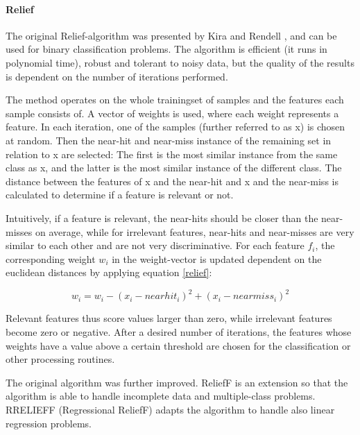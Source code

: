 \paragraph{Relief}
\label{par:methods.flat.filter.relief}

The original Relief-algorithm was presented by Kira and Rendell \cite{Kira:92}, and can be used for binary classification problems. The algorithm is efficient (it runs in polynomial time), robust and tolerant to noisy data, but the quality of the results is dependent on the number of iterations performed.

The method operates on the whole trainingset of samples and the features each sample consists of. A vector of weights is used, where each weight represents a feature. In each iteration, one of the samples (further referred to as x) is chosen at random. Then the near-hit and near-miss instance of the remaining set in relation to x are selected: The first is the most similar instance from the same class as x, and the latter is the most similar instance of the different class. The distance between the features of x and the near-hit and x and the near-miss is calculated to determine if a feature is relevant or not.  

Intuitively, if a feature is relevant, the near-hits should be closer than the near-misses on average, while for irrelevant features, near-hits and near-misses are very similar to each other and are not very discriminative. For each feature $f_i$, the corresponding weight $w_i$ in the weight-vector is updated dependent on the euclidean distances by applying equation \ref{relief}:

\begin{equation}
\label{relief}
	w_i = w_i - (x_i - nearhit_i)^2  + (x_i - nearmiss_i)^2
\end{equation}

Relevant features thus score values larger than zero, while irrelevant features become zero or negative. After a desired number of iterations, the features whose weights have a value above a certain threshold are chosen for the classification or other processing routines.

The original algorithm was further improved. ReliefF \cite{Kononenko:97} is an extension so that the algorithm is able to handle incomplete data and multiple-class problems. 
RRELIEFF (Regressional ReliefF) \cite{Robnik-Sikonja:97} adapts the algorithm to handle also linear regression problems.

